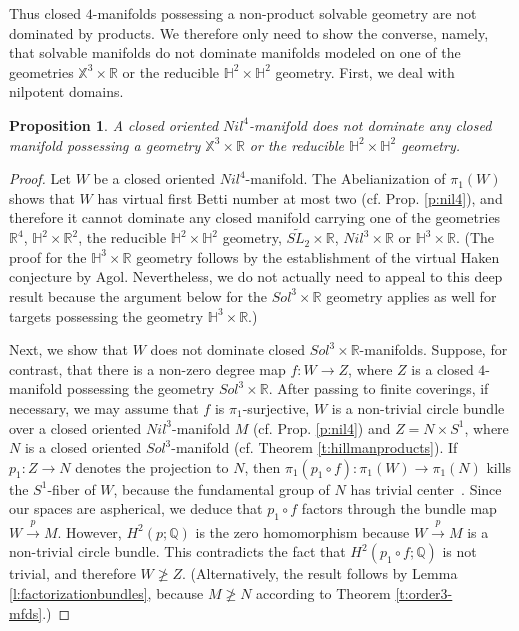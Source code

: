 \documentclass[12pt]{amsart}
\newtheorem{prop}[thm]{Proposition}
\theoremstyle{remark}
\begin{document}
Thus closed $4$-manifolds possessing a non-product solvable geometry are not dominated by products. We
therefore only need to show the converse, namely, that solvable manifolds do not dominate manifolds modeled on one of the geometries $\mathbb{X}^3 \times {\mathbb{R}}$ or the reducible $\mathbb{H}^2
\times \mathbb{H}^2$ geometry. 
First, we deal with nilpotent domains.

\begin{prop}
 A closed oriented $Nil^4$-manifold does not dominate any closed manifold possessing a geometry $\mathbb{X}^3 \times {\mathbb{R}}$ or the reducible $\mathbb{H}^2
\times \mathbb{H}^2$ geometry.
\end{prop}
\begin{proof}
 Let $W$ be a closed oriented $Nil^4$-manifold. The Abelianization of $\pi_1(W)$ shows that $W$ has virtual first Betti number at most two (cf. Prop. \ref{p:nil4}), and therefore it cannot dominate any closed manifold carrying one of the geometries ${\mathbb{R}}^4$, $\mathbb{H}^2 \times {\mathbb{R}}^2$, the reducible $\mathbb{H}^2 \times
\mathbb{H}^2$ geometry, $\widetilde{SL_2} \times {\mathbb{R}}$, $Nil^3 \times {\mathbb{R}}$ or $\mathbb{H}^3 \times {\mathbb{R}}$.  
(The proof for
the $\mathbb{H}^3 \times {\mathbb{R}}$ geometry follows by the establishment of the virtual Haken conjecture by Agol. 
Nevertheless, we do not actually need to appeal to this deep result because the argument below for the $Sol^3 \times {\mathbb{R}}$ geometry applies as well for targets possessing the
geometry $\mathbb{H}^3 \times {\mathbb{R}}$.)

Next, we show that $W$ does not dominate closed $Sol^3 \times {\mathbb{R}}$-manifolds. Suppose, for contrast, that there is a non-zero degree map $f \colon  W \longrightarrow Z$, where $Z$ is a closed $4$-manifold possessing the geometry $Sol^3 \times {\mathbb{R}}$. After
passing to finite coverings, if
necessary, we may assume that $f$ is $\pi_1$-surjective, $W$ is a non-trivial circle bundle over a closed oriented $Nil^3$-manifold $M$ (cf. Prop. \ref{p:nil4}) and $Z = N \times S^1$, where $N$ is a closed oriented $Sol^3$-manifold (cf. Theorem
\ref{t:hillmanproducts}). If $p_1
\colon Z \longrightarrow N$ denotes the projection to $N$, then $\pi_1(p_1 \circ f) \colon \pi_1(W) \longrightarrow \pi_1(N)$ kills the $S^1$-fiber of
$W$, because the fundamental group of $N$ has trivial center~\cite{Scott:3-mfds}. Since our spaces are aspherical, we deduce that $p_1 \circ f$ factors through the bundle map $W
\stackrel{p}\longrightarrow M$. However, $H^2(p;{\mathbb{Q}})$ is the zero homomorphism because $W \stackrel{p}\longrightarrow M$ is a non-trivial circle bundle. This contradicts the fact that $H^2(p_1 \circ f;{\mathbb{Q}})$ is not trivial,
and therefore $W\ngeq Z$. 
(Alternatively, the result follows by Lemma \ref{l:factorizationbundles}, because $M \ngeq N$ according to Theorem \ref{t:order3-mfds}.) 
\end{proof}
\end{document}
